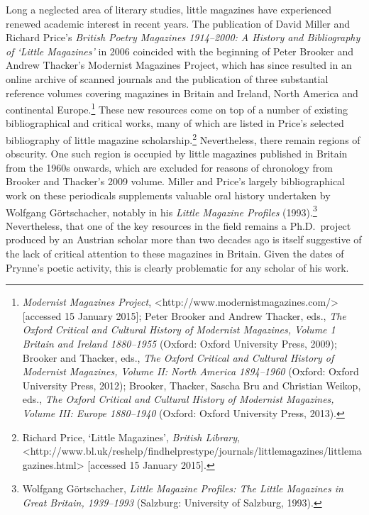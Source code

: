 \documentclass[]{article}
\begin{document}
Long a neglected area of literary studies, little magazines have
experienced renewed academic interest in recent years. The publication
of David Miller and Richard Price’s \emph{British Poetry Magazines
1914–2000: A History and Bibliography of ‘Little Magazines’} in 2006
coincided with the beginning of Peter Brooker and Andrew Thacker’s
Modernist Magazines Project, which has since resulted in an online
archive of scanned journals and the publication of three substantial
reference volumes covering magazines in Britain and Ireland, North
America and continental Europe.\footnote{\emph{Modernist Magazines
  Project}, \textless{}http://www.modernistmagazines.com/\textgreater{}
  {[}accessed 15 January 2015{]}; Peter Brooker and Andrew Thacker,
  eds., \emph{The Oxford Critical and Cultural History of Modernist
  Magazines, Volume 1 Britain and Ireland 1880–1955} (Oxford: Oxford
  University Press, 2009); Brooker and Thacker, eds., \emph{The Oxford
  Critical and Cultural History of Modernist Magazines, Volume II: North
  America 1894–1960} (Oxford: Oxford University Press, 2012); Brooker,
  Thacker, Sascha Bru and Christian Weikop, eds., \emph{The Oxford
  Critical and Cultural History of Modernist Magazines, Volume III:
  Europe 1880–1940} (Oxford: Oxford University Press, 2013).} These new
resources come on top of a number of existing bibliographical and
critical works, many of which are listed in Price’s selected
bibliography of little magazine scholarship.\footnote{Richard Price,
  ‘Little Magazines’, \emph{British Library},
  \textless{}http://www.bl.uk\slash reshelp\slash findhelprestype\slash journals\slash  littlemagazines\slash littlemagazines.html\textgreater{}
  {[}accessed 15 January 2015{]}.} Nevertheless, there remain regions of
obscurity. One such region is occupied by little magazines published in
Britain from the 1960s onwards, which are excluded for reasons of
chronology from Brooker and Thacker’s 2009 volume. Miller and Price’s
largely bibliographical work on these periodicals supplements valuable
oral history undertaken by Wolfgang Görtschacher, notably in his
\emph{Little Magazine Profiles} (1993).\footnote{Wolfgang Görtschacher,
  \emph{Little Magazine Profiles: The Little Magazines in Great Britain,
  1939–1993} (Salzburg: University of Salzburg, 1993).} Nevertheless,
that one of the key resources in the field remains a Ph.D.~project
produced by an Austrian scholar more than two decades ago is itself
suggestive of the lack of critical attention to these magazines in
Britain. Given the dates of Prynne’s poetic activity, this is clearly
problematic for any scholar of his work.
\end{document}
